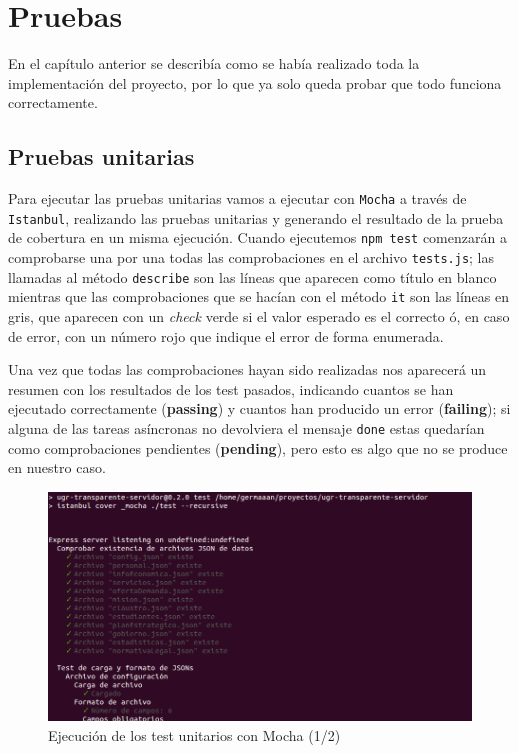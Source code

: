 \chapter{Pruebas}

En el capítulo anterior se describía como se había realizado toda la implementación del proyecto, por lo que ya solo queda probar que todo funciona correctamente.

\section{Pruebas unitarias}

Para ejecutar las pruebas unitarias vamos a ejecutar con {\tt Mocha} a través de {\tt Istanbul}, realizando las pruebas unitarias y generando el resultado de la prueba de cobertura en un misma ejecución. Cuando ejecutemos {\tt npm test} comenzarán a comprobarse una por una todas las comprobaciones en el archivo {\tt tests.js}; las llamadas al método {\tt describe} son las líneas que aparecen como título en blanco mientras que las comprobaciones que se hacían con el método {\tt it} son las líneas en gris, que aparecen con un \textit{check} verde si el valor esperado es el correcto ó, en caso de error, con un número rojo que indique el error de forma enumerada.

\bigskip
Una vez que todas las comprobaciones hayan sido realizadas nos aparecerá un resumen con los resultados de los test pasados, indicando cuantos se han ejecutado correctamente (\textbf{passing}) y cuantos han producido un error (\textbf{failing}); si alguna de las tareas asíncronas no devolviera el mensaje {\tt done} estas quedarían como comprobaciones pendientes (\textbf{pending}), pero esto es algo que no se produce en nuestro caso.

\begin{figure}[!ht]
	\begin{center}
		\includegraphics[width=1\textwidth]{../images/tests_unitarios_01.png}
		\caption{Ejecución de los test unitarios con Mocha (1/2)}
		\label{fig:tests_unitarios_01}
	\end{center}
\end{figure}

